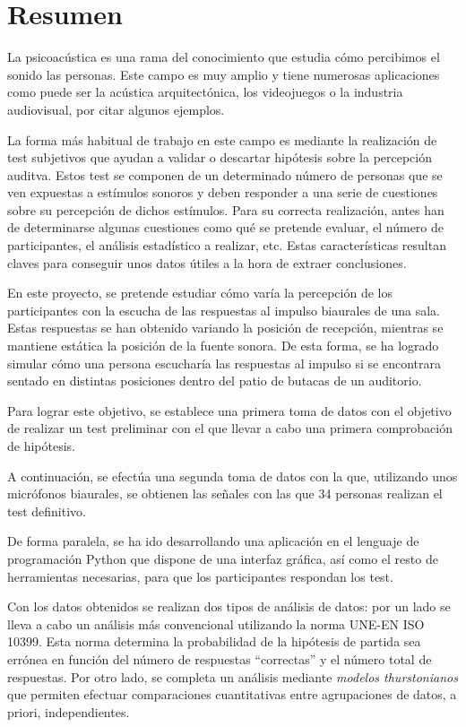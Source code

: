 \documentclass[11pt,a4paper,twoside]{book}
\author{Víctor de Tejada Molera}
\begin{document}
\chapter*{Resumen}
    La psicoacústica es una rama del conocimiento que estudia cómo percibimos el sonido las personas. Este campo es muy amplio y tiene numerosas aplicaciones como puede ser la acústica arquitectónica, los videojuegos o la industria audiovisual, por citar algunos ejemplos.

    La forma más habitual de trabajo en este campo es mediante la realización de test subjetivos que ayudan a validar o descartar hipótesis sobre la percepción auditva. Estos test se componen de un determinado número de personas que se ven expuestas a estímulos sonoros y deben responder a una serie de cuestiones sobre su percepción de dichos estímulos. Para su correcta realización, antes han de determinarse algunas cuestiones como qué se pretende evaluar, el número de participantes, el análisis estadístico a realizar, etc. Estas características resultan claves para conseguir unos datos útiles a la hora de extraer conclusiones.

    En este proyecto, se pretende estudiar cómo varía la percepción de los participantes con la escucha de las respuestas al impulso biaurales de una sala. Estas respuestas se han obtenido variando la posición de recepción, mientras se mantiene estática la posición de la fuente sonora. De esta forma, se ha logrado simular cómo una persona escucharía las respuestas al impulso si se encontrara sentado en distintas posiciones dentro del patio de butacas de un auditorio.

    Para lograr este objetivo, se establece una primera toma de datos con el objetivo de realizar un test preliminar con el que llevar a cabo una primera comprobación de hipótesis. 

    A continuación, se efectúa una segunda toma de datos con la que, utilizando unos micrófonos biaurales, se obtienen las señales con las que 34 personas realizan el test definitivo.

    De forma paralela, se ha ido desarrollando una aplicación en el lenguaje de programación Python que dispone de una interfaz gráfica, así como el resto de herramientas necesarias, para que los participantes respondan los test.

    Con los datos obtenidos se realizan dos tipos de análisis de datos: por un lado se lleva a cabo un análisis más convencional utilizando la norma UNE-EN ISO 10399. Esta norma determina la probabilidad de la hipótesis de partida sea errónea en función del número de respuestas ``correctas'' y el número total de respuestas. Por otro lado, se completa un análisis mediante \textit{modelos thurstonianos} que permiten efectuar comparaciones cuantitativas entre agrupaciones de datos, a priori, independientes.
\end{document}

